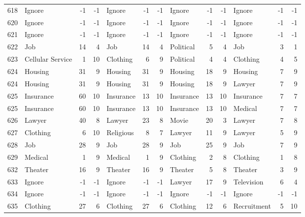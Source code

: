 \begin{figure}[htbp]
\begin{tabular}{rlrrlrrlrrlrr}
    618   & Ignore & -1    & -1    & Ignore & -1    & -1    & Ignore & -1    & -1    & Ignore & -1    & -1 \\
    620   & Ignore & -1    & -1    & Ignore & -1    & -1    & Ignore & -1    & -1    & Ignore & -1    & -1 \\
    621   & Ignore & -1    & -1    & Ignore & -1    & -1    & Ignore & -1    & -1    & Ignore & -1    & -1 \\
    622   & Job   & 14    & 4     & Job   & 14    & 4     & Political & 5     & 4     & Job   & 3     & 1 \\
    623   & Cellular Service & 1     & 10    & Clothing & 6     & 9     & Political & 4     & 4     & Clothing & 4     & 5 \\
    624   & Housing & 31    & 9     & Housing & 31    & 9     & Housing & 18    & 9     & Housing & 7     & 9 \\
    624   & Housing & 31    & 9     & Housing & 31    & 9     & Housing & 18    & 9     & Lawyer & 7     & 9 \\
    625   & Insurance & 60    & 10    & Insurance & 13    & 10    & Insurance & 13    & 10    & Insurance & 7     & 7 \\
    625   & Insurance & 60    & 10    & Insurance & 13    & 10    & Insurance & 13    & 10    & Medical & 7     & 7 \\
    626   & Lawyer & 40    & 8     & Lawyer & 23    & 8     & Movie & 20    & 3     & Lawyer & 7     & 8 \\
    627   & Clothing & 6     & 10    & Religious & 8     & 7     & Lawyer & 11    & 9     & Lawyer & 5     & 9 \\
    628   & Job   & 28    & 9     & Job   & 28    & 9     & Job   & 25    & 9     & Job   & 7     & 9 \\
    629   & Medical & 1     & 9     & Medical & 1     & 9     & Clothing & 2     & 8     & Clothing & 1     & 8 \\
    632   & Theater & 16    & 9     & Theater & 16    & 9     & Theater & 5     & 8     & Theater & 3     & 9 \\
    633   & Ignore & -1    & -1    & Ignore & -1    & -1    & Lawyer & 17    & 9     & Television & 6     & 4 \\
    634   & Ignore & -1    & -1    & Ignore & -1    & -1    & Ignore & -1    & -1    & Ignore & -1    & -1 \\
    635   & Clothing & 27    & 6     & Clothing & 27    & 6     & Clothing & 12    & 6     & Recruitment & 5     & 10 \\

\end{tabular}
\end{figure}
